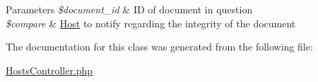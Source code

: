 \begin{DoxyParams}{\-Parameters}
{\em \$document\-\_\-id} & \-I\-D of document in question \\
\hline
{\em \$compare} & \hyperlink{classHost}{\-Host} to notify regarding the integrity of the document \\
\hline
\end{DoxyParams}


\-The documentation for this class was generated from the following file\-:\begin{DoxyCompactItemize}
\item 
\hyperlink{HostsController_8php}{\-Hosts\-Controller.\-php}\end{DoxyCompactItemize}
